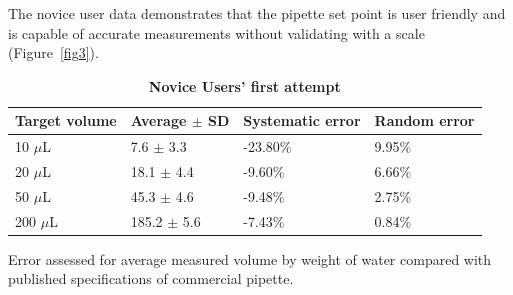 \documentclass[10pt,letterpaper]{article}
\begin{document}
The novice user data demonstrates that the pipette set point is user friendly and is capable of accurate measurements without validating with a scale (Figure~\ref{fig3}).

\begin{table}[]
\caption{
\bf{Novice Users' first attempt}}
\begin{tabular}{llll}
Target volume & Average $\pm$ SD & Systematic error  & Random error\\
\hline
10 $\mu$L         & 7.6 $\pm$ 3.3     & -23.80\% & 9.95\% \\
\hline
20 $\mu$L         & 18.1 $\pm$ 4.4   & -9.60\%   & 6.66\% \\
\hline
50 $\mu$L         & 45.3 $\pm$ 4.6   & -9.48\%   & 2.75\% \\
\hline
200 $\mu$L       & 185.2 $\pm$ 5.6 & -7.43\%   & 0.84\%
\end{tabular}
\begin{flushleft} Error assessed for average measured volume by weight of water compared with published specifications of commercial pipette.
\end{flushleft}
\label{table2}
\end{table}

\end{document}
